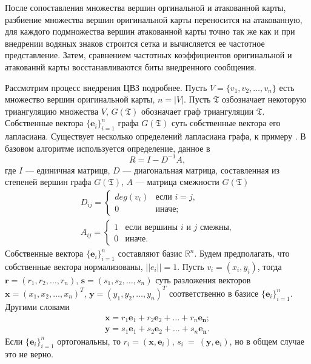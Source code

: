 После сопоставления множества вершин оргинальной и атакованной карты, разбиение множества
вершин оригинальной карты переносится на атакованную, для каждого подмножества вершин атакованной
карты точно так же как и при внедрении водяных знаков строится сетка и вычисляется ее частотное
представление. Затем, сравнением частотных коэффициентов оригинальной и атакованнй карты
восстанавливаются биты внедренного сообщения. 

Рассмотрим процесс внедрения ЦВЗ подробнее.  
Пусть $V = \{v_1, v_2, \dots, v_n\}$ есть множество вершин оригинальной карты, $n = |V|$. 
Пусть $\mathfrak{T}$ озбозначает некоторую триангуляцию множества $V$, $G(\mathfrak{T})$ обозначает 
граф триангуляции $\mathfrak{T}$. Собственные вектора $\{\mathbf{e}_i\}_{i=1}^n$ графа $G(\mathfrak{T})$ суть 
собственные вектора его лапласиана. 
Существует несколько определений лапласиана графа, к примеру \cite{Biggs, Chung, Zhang}. В базовом алгоритме 
используется определение, данное в \cite{Biggs}
$$R = I - D^{-1} A,$$ где $I$ --- единичная матрицв, $D$ --- диагональная матрица, составленная из 
степеней вершин графа $G(\mathfrak{T})$, $A$ --- матрица смежности $G(\mathfrak{T})$
\begin{eqnarray*}
  D_{ij} = \begin{cases} deg(v_i) &\text{если $i = j$,} \\ 0 &\text{иначе;} \end{cases} \\
  A_{ij} = \begin{cases} 1 &\text{если вершины $i$ и $j$ смежны,} \\ 0 &\text{иначе.} \end{cases} 
\end{eqnarray*}
Собственные вектора $\{\mathbf{e}_i\}_{i=1}^n$ составляют базис $\mathbb{R}^n$. Будем предполагать, что 
собственные вектора нормализованы, $||e_i|| = 1$. 
Пусть $v_i = (x_i, y_i)$, тогда $\mathbf{r} = (r_1, r_2, \dots, r_n)$, $\mathbf{s} = (s_1, s_2, \dots, s_n)$ 
суть разложения векторов $\mathbf{x} = (x_1, x_2, \dots, x_n)^T$, $\mathbf{y} = (y_1, y_2, \dots, y_n)^T$ 
соответственно в базисе $\{\mathbf{e}_i\}_{i=1}^n$. Другими словами 
\begin{eqnarray*}
  \mathbf{x} = r_1 \mathbf{e}_1 + r_2 \mathbf{e}_2 + \dots + r_n \mathbf{e_n}; \\ 
  \mathbf{y} = s_1 \mathbf{e}_1 + s_2 \mathbf{e}_2 + \dots + s_n \mathbf{e_n}.  
\end{eqnarray*}
Если $\{\mathbf{e}_i\}_{i=1}^n$ ортогональны, то $r_i = (\mathbf{x}, \mathbf{e}_i)$, 
$s_i~=~(\mathbf{y}, \mathbf{e}_i)$, но в общем случае это не верно. 

